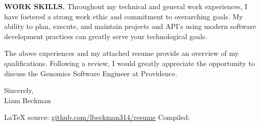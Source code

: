 \textbf{WORK SKILLS.} Throughout my technical and general work experiences, I have fostered a strong work ethic and commitment to overarching goals. My ability to plan, execute, and maintain projects and API's using modern software development practices can greatly serve your technological goals.

\vspace*{\baselineskip}

The above experiences and my attached resume provide an overview of my qualifications. Following a review, I would greatly appreciate the opportunity to discuss the Genomics Software Engineer at Providence.

\vspace*{2\baselineskip}

Sincerely,\\

Liam Beckman

\vfill \myBreak{}
\textcolor{my-red}{\LaTeX{} source:} \textcolor{my-blue}{\href{https://github.com/lbeckman314/resume}{github.com/lbeckman314/resume}}
\hfill
\textcolor{my-red}{Compiled:} \textcolor{my-blue}{\href{https://liambeckman.com/jenkins/job/resume/}{\DTMtoday}}

